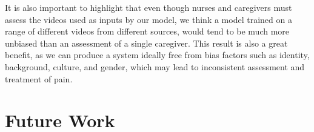 It is also important to highlight that even though nurses and caregivers must assess the videos used as inputs by our model, we think a model trained on a range of different videos from different sources, would tend to be much more unbiased than an assessment of a single caregiver. This result is also a great benefit, as we can produce a system ideally free from bias factors such as identity, background, culture, and gender, which may lead to inconsistent assessment and treatment of pain.

\section{Future Work}